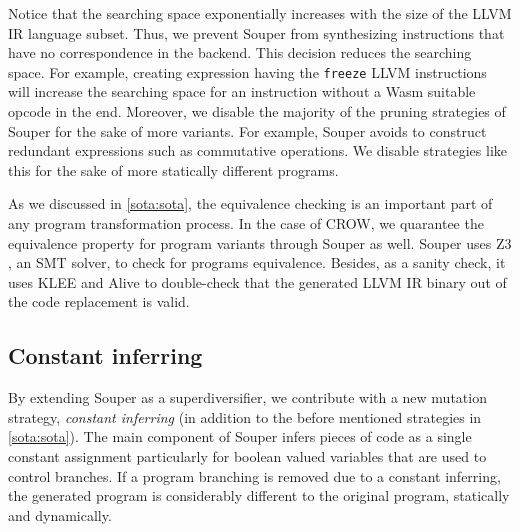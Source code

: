 Notice that the searching space exponentially increases with the size of the LLVM IR language subset. Thus,
we prevent Souper from synthesizing instructions that have no correspondence in the \wasm backend. This decision reduces the searching space. For example, creating expression having the  \texttt{freeze} LLVM instructions will increase the searching space for an instruction without a Wasm  suitable opcode in the end.
Moreover, we disable the majority of the pruning strategies of Souper for the sake of more variants. For example, Souper avoids to construct redundant expressions such as commutative operations. We disable strategies like this for the sake of more statically different programs.  %


As we discussed in \autoref{sota:sota}, the equivalence checking is an important part of any program transformation process. In the case of CROW, we quarantee the equivalence property for program variants through Souper as well. Souper uses Z3 \citationneeded, an SMT solver, to check for programs equivalence.  Besides, as a sanity check, it uses KLEE and Alive to double-check that the generated LLVM IR binary out of the code replacement is valid.



\subsection*{Constant inferring}

By extending Souper as a superdiversifier, we contribute with a new mutation strategy, \emph{constant inferring} (in addition to the before mentioned strategies in \autoref{sota:sota}).  
The main component of Souper infers pieces of code as a single constant assignment particularly for boolean valued variables that are used to control branches.
If a program branching is removed due to a constant inferring, the generated program is considerably different to the original program, statically and dynamically.

